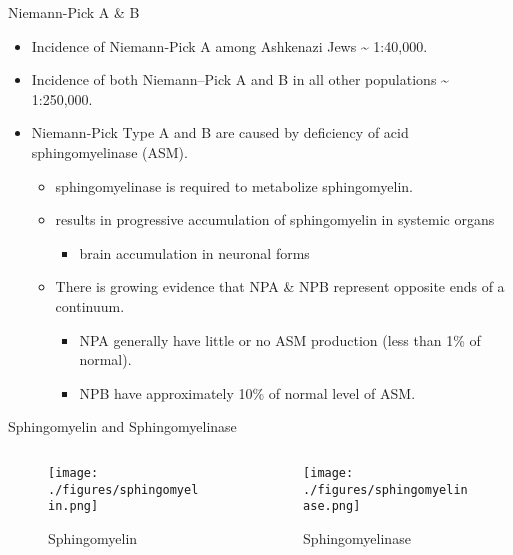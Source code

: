 \documentclass[presentation, smaller]{beamer}
\begin{document}
\begin{frame}[label={sec:orgheadline2}]{Niemann-Pick A \& B}
\begin{itemize}
\item Incidence of Niemann-Pick A among Ashkenazi Jews \textasciitilde{} 1:40,000.
\item Incidence of both Niemann–Pick A and B in all other populations \textasciitilde{} 1:250,000.
\item Niemann-Pick Type A and B are caused by deficiency of acid sphingomyelinase (ASM).
\begin{itemize}
\item sphingomyelinase is required to metabolize sphingomyelin.
\item results in progressive accumulation of sphingomyelin in systemic organs
\begin{itemize}
\item brain accumulation in neuronal forms
\end{itemize}
\item There is growing evidence that NPA \& NPB represent opposite ends of a continuum.
\begin{itemize}
\item NPA generally have little or no ASM production (less than 1\% of normal).
\item NPB have approximately 10\% of normal level of ASM.
\end{itemize}
\end{itemize}
\end{itemize}
\end{frame}

\begin{frame}[label={sec:orgheadline3}]{Sphingomyelin and Sphingomyelinase}
\begin{columns}
\begin{column}{0.5\columnwidth}
\begin{figure}[htb]
\centering
\texttt{[image: ./figures/sphingomyelin.png]}
\caption{\label{fig:}
Sphingomyelin}
\end{figure}
\end{column}

\begin{column}{0.5\columnwidth}
\begin{figure}[htb]
\centering
\texttt{[image: ./figures/sphingomyelinase.png]}
\caption{\label{fig:}
Sphingomyelinase}
\end{figure}
\end{column}
\end{columns}
\end{frame}
\end{document}
